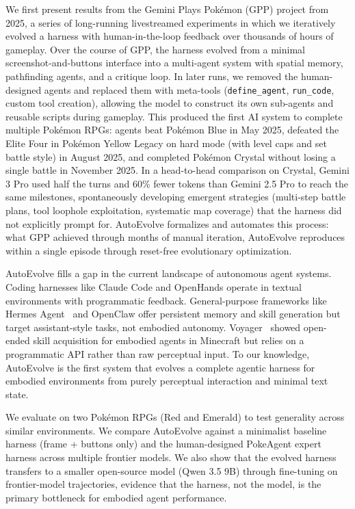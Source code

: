 We first present results from the Gemini Plays Pok\'{e}mon (GPP) project from 2025, a series of long-running livestreamed experiments in which we iteratively evolved a harness with human-in-the-loop feedback over thousands of hours of gameplay. Over the course of GPP, the harness evolved from a minimal screenshot-and-buttons interface into a multi-agent system with spatial memory, pathfinding agents, and a critique loop. In later runs, we removed the human-designed agents and replaced them with meta-tools (\texttt{define\_agent}, \texttt{run\_code}, custom tool creation), allowing the model to construct its own sub-agents and reusable scripts during gameplay. This produced the first AI system to complete multiple Pok\'{e}mon RPGs: agents beat Pok\'{e}mon Blue in May 2025, defeated the Elite Four in Pok\'{e}mon Yellow Legacy on hard mode (with level caps and set battle style) in August 2025, and completed Pok\'{e}mon Crystal without losing a single battle in November 2025. In a head-to-head comparison on Crystal, Gemini 3 Pro used half the turns and 60\% fewer tokens than Gemini 2.5 Pro to reach the same milestones, spontaneously developing emergent strategies (multi-step battle plans, tool loophole exploitation, systematic map coverage) that the harness did not explicitly prompt for. AutoEvolve formalizes and automates this process: what GPP achieved through months of manual iteration, AutoEvolve reproduces within a single episode through reset-free evolutionary optimization.

AutoEvolve fills a gap in the current landscape of autonomous agent systems. Coding harnesses like Claude Code and OpenHands operate in textual environments with programmatic feedback. General-purpose frameworks like Hermes Agent~\citep{nousresearch2026hermes} and OpenClaw offer persistent memory and skill generation but target assistant-style tasks, not embodied autonomy. Voyager~\citep{wang2023voyager} showed open-ended skill acquisition for embodied agents in Minecraft but relies on a programmatic API rather than raw perceptual input. To our knowledge, AutoEvolve is the first system that evolves a complete agentic harness for embodied environments from purely perceptual interaction and minimal text state.

 We evaluate on two Pok\'{e}mon RPGs (Red and Emerald) to test generality across similar environments. We compare AutoEvolve against a minimalist baseline harness (frame + buttons only) and the human-designed PokeAgent expert harness across multiple frontier models. We also show that the evolved harness transfers to a smaller open-source model (Qwen 3.5 9B) through fine-tuning on frontier-model trajectories, evidence that the harness, not the model, is the primary bottleneck for embodied agent performance.

